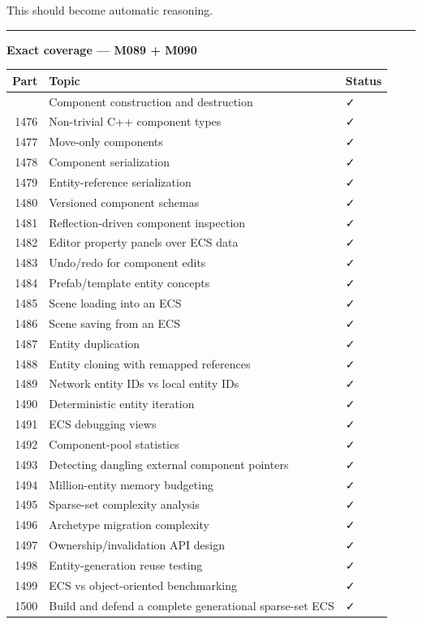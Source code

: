 This should become automatic reasoning.

\begin{center}\rule{0.5\linewidth}{0.5pt}\end{center}

\textbf{Exact coverage --- M089 + M090}

{\def\LTcaptype{none} %
\begin{longtable}[]{@{}rll@{}}
\toprule\noalign{}
Part & Topic & Status \\
\midrule\noalign{}
\endhead
\bottomrule\noalign{}
\endlastfoot
1475 & Component construction and destruction & ✓ \\
1476 & Non-trivial C++ component types & ✓ \\
1477 & Move-only components & ✓ \\
1478 & Component serialization & ✓ \\
1479 & Entity-reference serialization & ✓ \\
1480 & Versioned component schemas & ✓ \\
1481 & Reflection-driven component inspection & ✓ \\
1482 & Editor property panels over ECS data & ✓ \\
1483 & Undo/redo for component edits & ✓ \\
1484 & Prefab/template entity concepts & ✓ \\
1485 & Scene loading into an ECS & ✓ \\
1486 & Scene saving from an ECS & ✓ \\
1487 & Entity duplication & ✓ \\
1488 & Entity cloning with remapped references & ✓ \\
1489 & Network entity IDs vs local entity IDs & ✓ \\
1490 & Deterministic entity iteration & ✓ \\
1491 & ECS debugging views & ✓ \\
1492 & Component-pool statistics & ✓ \\
1493 & Detecting dangling external component pointers & ✓ \\
1494 & Million-entity memory budgeting & ✓ \\
1495 & Sparse-set complexity analysis & ✓ \\
1496 & Archetype migration complexity & ✓ \\
1497 & Ownership/invalidation API design & ✓ \\
1498 & Entity-generation reuse testing & ✓ \\
1499 & ECS vs object-oriented benchmarking & ✓ \\
1500 & Build and defend a complete generational sparse-set ECS & ✓ \\
\end{longtable}
}

